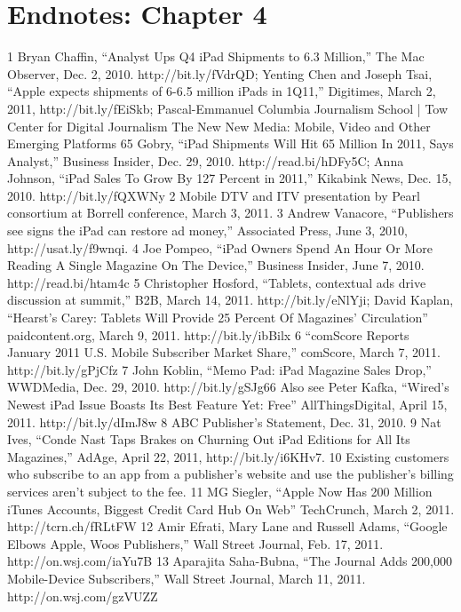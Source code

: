 \section{Endnotes: Chapter 4}
1 Bryan Chaffin, ``Analyst Ups Q4 iPad Shipments to 6.3 Million,'' The Mac Observer, Dec. 2,
2010. http://bit.ly/fVdrQD; Yenting Chen and Joseph Tsai, ``Apple expects shipments of 6-6.5
million iPads in 1Q11,'' Digitimes, March 2, 2011, http://bit.ly/fEiSkb; Pascal-Emmanuel
Columbia Journalism School | Tow Center for Digital Journalism
The New New Media: Mobile, Video and Other Emerging Platforms 65
Gobry, ``iPad Shipments Will Hit 65 Million In 2011, Says Analyst,'' Business Insider, Dec. 29,
2010. http://read.bi/hDFy5C; Anna Johnson, ``iPad Sales To Grow By 127 Percent in 2011,''
Kikabink News, Dec. 15, 2010. http://bit.ly/fQXWNy
2 Mobile DTV and ITV presentation by Pearl consortium at Borrell conference, March 3, 2011.
3 Andrew Vanacore, ``Publishers see signs the iPad can restore ad money,'' Associated Press,
June 3, 2010, http://usat.ly/f9wnqi.
4 Joe Pompeo, ``iPad Owners Spend An Hour Or More Reading A Single Magazine On The
Device,'' Business Insider, June 7, 2010. http://read.bi/htam4c
5 Christopher Hosford, ``Tablets, contextual ads drive discussion at summit,'' B2B,
March 14, 2011. http://bit.ly/eNlYji; David Kaplan, ``Hearst's Carey: Tablets Will Provide
25 Percent Of Magazines' Circulation'' paidcontent.org, March 9, 2011. http://bit.ly/ibBilx
6 ``comScore Reports January 2011 U.S. Mobile Subscriber Market Share,'' comScore,
March 7, 2011. http://bit.ly/gPjCfz
7 John Koblin, ``Memo Pad: iPad Magazine Sales Drop,'' WWDMedia, Dec. 29, 2010.
http://bit.ly/gSJg66 Also see Peter Kafka, ``Wired's Newest iPad Issue Boasts Its Best Feature
Yet: Free'' AllThingsDigital, April 15, 2011. http://bit.ly/dImJ8w
8 ABC Publisher's Statement, Dec. 31, 2010.
9 Nat Ives, ``Conde Nast Taps Brakes on Churning Out iPad Editions for All Its Magazines,''
AdAge, April 22, 2011, http://bit.ly/i6KHv7.
10 Existing customers who subscribe to an app from a publisher's website and use the publisher's
billing services aren't subject to the fee.
11 MG Siegler, ``Apple Now Has 200 Million iTunes Accounts, Biggest Credit Card Hub On
Web'' TechCrunch, March 2, 2011. http://tcrn.ch/fRLtFW
12 Amir Efrati, Mary Lane and Russell Adams, ``Google Elbows Apple, Woos Publishers,''
Wall Street Journal, Feb. 17, 2011. http://on.wsj.com/iaYu7B
13 Aparajita Saha-Bubna, ``The Journal Adds 200,000 Mobile-Device Subscribers,''
Wall Street Journal, March 11, 2011. http://on.wsj.com/gzVUZZ
